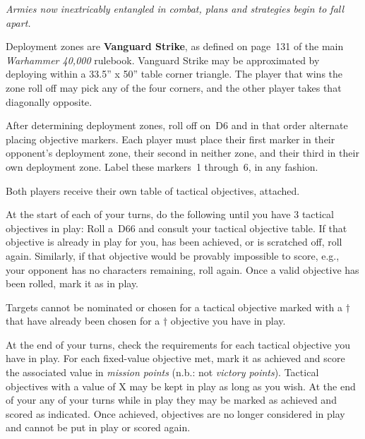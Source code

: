 \clearpage
{}

\centerline{\emph{Armies now inextricably entangled in combat, plans
    and strategies begin to fall apart.}}


Deployment zones are \textbf{Vanguard Strike}, as defined on page~131
of the main \emph{Warhammer 40,000} rulebook.  Vanguard Strike may be
approximated by deploying within a 33.5'' x 50'' table corner
triangle.  The player that wins the zone roll off may pick any of the
four corners, and the other player takes that diagonally opposite.

\bigskip%
After determining deployment zones, roll off on~D6 and in that order
alternate placing objective markers.  Each player must place their
first marker in their opponent's deployment zone, their second in
neither zone, and their third in their own deployment zone.  Label
these markers~1 through~6, in any fashion.

\bigskip%
Both players receive their own table of tactical objectives, attached.



At the start of each of your turns, do the following until you have 3
tactical objectives in play: Roll a~D66 and consult your tactical
objective table.  If that objective is already in play for you, has
been achieved, or is scratched off, roll again.  Similarly, if that
objective would be provably impossible to score, e.g., your opponent
has no characters remaining, roll again.  Once a valid objective has
been rolled, mark it as in play.

Targets cannot be nominated or chosen for a tactical objective marked
with a $\dagger$ that have already been chosen for a $\dagger$
objective you have in play.

\smallskip
At the end of your turns, check the requirements for each tactical
objective you have in play.  For each fixed-value objective met, mark
it as achieved and score the associated value in \emph{mission
  points} (n.b.: not \emph{victory points}).  Tactical objectives with
a value of X may be kept in play as long as you wish.  At the end of
your any of your turns while in play they may be marked as achieved
and scored as indicated.  Once achieved, objectives are no longer
considered in play and cannot be put in play or scored again.

